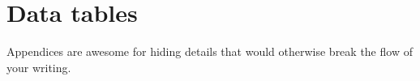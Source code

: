 \chapter{Data tables}
\label{app:data_tables}

Appendices are awesome for hiding details that would otherwise break the flow
of your writing.

